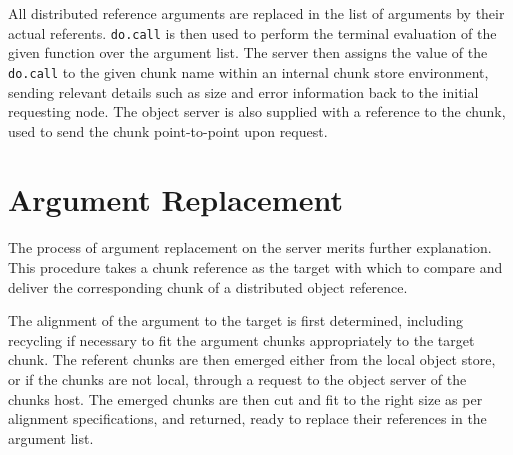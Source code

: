 \documentclass[a4paper,10pt]{article}
\begin{document}
All distributed reference arguments are replaced in the list of arguments by
their actual referents.
\texttt{do.call} is then used to perform the terminal evaluation of
the given function over the argument list.
The server then assigns the value of the \texttt{do.call} to the given
chunk name within an internal chunk store environment, sending relevant
details such as size and error information back to the initial requesting node. The object server is also supplied with a reference to the chunk, used to send the chunk point-to-point upon request.

\section{Argument Replacement}

The process of argument replacement on the server merits further explanation.
This procedure takes a chunk reference as the target with which to compare and
deliver the corresponding chunk of a distributed object reference.

The alignment of the argument to the target is first determined, including recycling if necessary to fit the argument chunks appropriately to the target chunk. The referent chunks are then emerged either from the local object store, or if the chunks are not local, through a request to the object server of the chunks host.
The emerged chunks are then cut and fit to the right size as per alignment specifications, and returned, ready to replace their references in the argument list.
\end{document}
